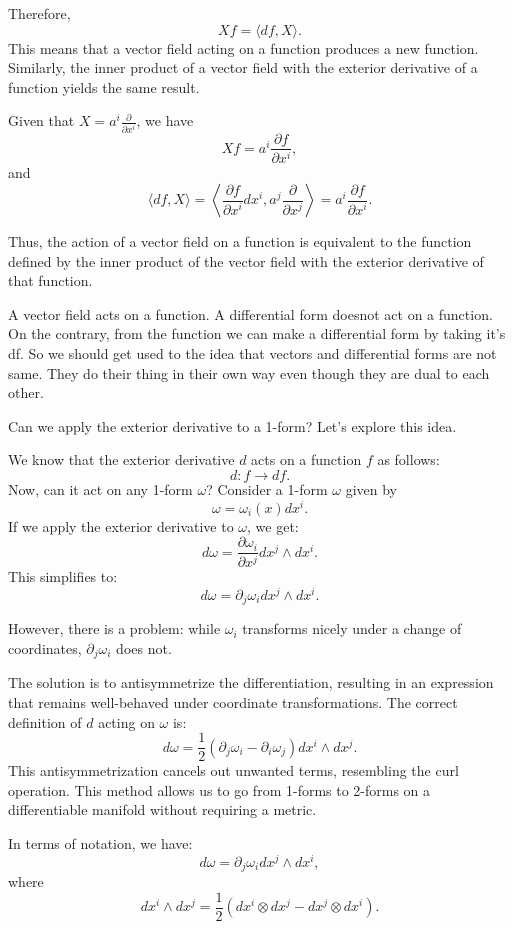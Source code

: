 \documentclass{article}
\begin{document}
Therefore,
\[
Xf = \langle df, X \rangle.
\]
This means that a vector field acting on a function produces a new function. Similarly, the inner product of a vector field with the exterior derivative of a function yields the same result.

Given that \( X = a^i \frac{\partial}{\partial x^i} \), we have
\[
Xf = a^i \frac{\partial f}{\partial x^i},
\]
and
\[
\langle df, X \rangle = \left\langle \frac{\partial f}{\partial x^i} dx^i, a^j \frac{\partial}{\partial x^j} \right\rangle = a^i \frac{\partial f}{\partial x^i}.
\]

Thus, the action of a vector field on a function is equivalent to the function defined by the inner product of the vector field with the exterior derivative of that function.

A vector field acts on a function. A differential form doesnot act on a function. On the contrary, from the function we can make a differential form by taking it's df. So we should get used to the idea that vectors and differential forms are not same. They do their thing in their own way even though they are dual to each other. 


Can we apply the exterior derivative to a 1-form? Let's explore this idea.

We know that the exterior derivative \( d \) acts on a function \( f \) as follows:
\[
d: f \to df.
\]
Now, can it act on any 1-form \(\omega\)? Consider a 1-form \(\omega\) given by
\[
\omega = \omega_i(x) dx^i.
\]
If we apply the exterior derivative to \(\omega\), we get:
\[
d\omega = \frac{\partial \omega_i}{\partial x^j} dx^j \wedge dx^i.
\]
This simplifies to:
\[
d\omega = \partial_j \omega_i dx^j \wedge dx^i.
\]

However, there is a problem: while \(\omega_i\) transforms nicely under a change of coordinates, \(\partial_j \omega_i\) does not.

The solution is to antisymmetrize the differentiation, resulting in an expression that remains well-behaved under coordinate transformations. The correct definition of \(d\) acting on \(\omega\) is:
\[
d\omega = \frac{1}{2} (\partial_j \omega_i - \partial_i \omega_j) dx^i \wedge dx^j.
\]
This antisymmetrization cancels out unwanted terms, resembling the curl operation. This method allows us to go from 1-forms to 2-forms on a differentiable manifold without requiring a metric.

In terms of notation, we have:
\[
d\omega = \partial_j \omega_i dx^j \wedge dx^i,
\]
where
\[
dx^i \wedge dx^j = \frac{1}{2} (dx^i \otimes dx^j - dx^j \otimes dx^i).
\]
\end{document}
